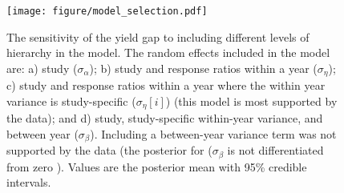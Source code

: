 \documentclass{article}\usepackage[]{graphicx}\usepackage[]{color}
\begin{document}
\begin{figure}
\centering
\texttt{[image: figure/model\_selection.pdf]}
\caption{The sensitivity of the yield gap to including different
levels of hierarchy in the model. The random effects included in
the model are: a) study ($\sigma_{\alpha}$); b) study and response
ratios within a year ($\sigma_{\eta}$); c) study and response
ratios within a year where the within year variance is
study-specific ($\sigma_{\eta}[i]$) (this model is most supported
by the data); and d) study, study-specific within-year variance,
and between year ($\sigma_{\beta}$). Including a between-year
variance term was not supported by the data (the posterior for
($\sigma_{\beta}$ is not differentiated from zero ). Values are
the posterior mean with 95\% credible intervals.}
\label{fig:model_selection}
\end{figure}
\clearpage
\end{document}

